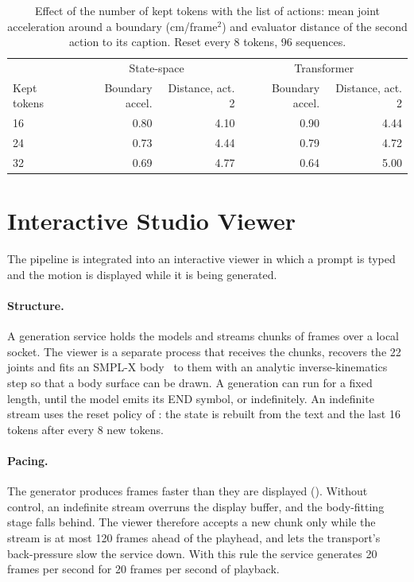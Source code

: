 \begin{table}[H]
\centering
\caption{Effect of the number of kept tokens with the list of actions: mean joint acceleration around a boundary (cm/frame$^2$) and evaluator distance of the second action to its caption. Reset every 8 tokens, 96 sequences.}
\label{tab:boundary}
\begin{tabular}{lrrrr}
\toprule
 & \multicolumn{2}{c}{State-space} & \multicolumn{2}{c}{Transformer} \\
Kept tokens & Boundary accel. & Distance, act. 2 & Boundary accel. & Distance, act. 2 \\
\midrule
16 & 0.80 & 4.10 & 0.90 & 4.44 \\
24 & 0.73 & 4.44 & 0.79 & 4.72 \\
32 & 0.69 & 4.77 & 0.64 & 5.00 \\
\bottomrule
\end{tabular}
\end{table}

\section{Interactive Studio Viewer}
\label{sec:stream_viewer}

The pipeline is integrated into an interactive viewer in which a prompt is typed and the motion is displayed while it is being generated.

\paragraph{Structure.} A generation service holds the models and streams chunks of frames over a local socket. The viewer is a separate process that receives the chunks, recovers the 22 joints and fits an SMPL-X body~\cite{pavlakos2019smplx} to them with an analytic inverse-kinematics step so that a body surface can be drawn. A generation can run for a fixed length, until the model emits its END symbol, or indefinitely. An indefinite stream uses the reset policy of : the state is rebuilt from the text and the last 16 tokens after every 8 new tokens.

\paragraph{Pacing.} The generator produces frames faster than they are displayed (). Without control, an indefinite stream overruns the display buffer, and the body-fitting stage falls behind. The viewer therefore accepts a new chunk only while the stream is at most 120 frames ahead of the playhead, and lets the transport's back-pressure slow the service down. With this rule the service generates 20 frames per second for 20 frames per second of playback.

